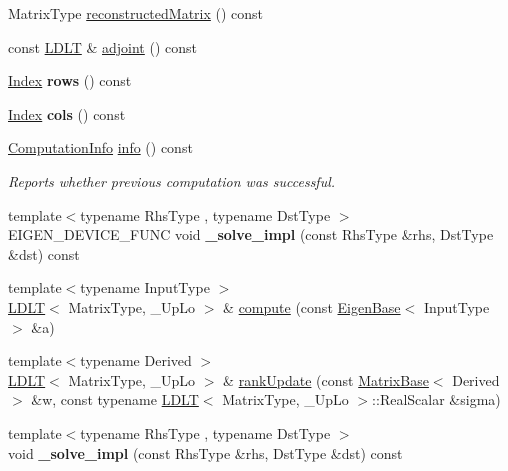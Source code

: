 \begin{DoxyCompactItemize}
\item 
Matrix\+Type \mbox{\hyperlink{class_eigen_1_1_l_d_l_t_ae3693372ca29f50d87d324dfadaae148}{reconstructed\+Matrix}} () const
\item 
const \mbox{\hyperlink{class_eigen_1_1_l_d_l_t}{L\+D\+LT}} \& \mbox{\hyperlink{class_eigen_1_1_l_d_l_t_ac656a209860fa0c6a8faa8bb9f9a06ef}{adjoint}} () const
\item 
\mbox{\label{class_eigen_1_1_l_d_l_t_a96efc3befd020e2260ea1cb6f35769a2}} 
\mbox{\hyperlink{class_eigen_1_1_l_d_l_t_ad9c57eb2fb3bbccd51b9d2e111bea355}{Index}} {\bfseries rows} () const
\item 
\mbox{\label{class_eigen_1_1_l_d_l_t_ae848b7d0c0c7dfb3d029a875363c7848}} 
\mbox{\hyperlink{class_eigen_1_1_l_d_l_t_ad9c57eb2fb3bbccd51b9d2e111bea355}{Index}} {\bfseries cols} () const
\item 
\mbox{\hyperlink{group__enums_ga85fad7b87587764e5cf6b513a9e0ee5e}{Computation\+Info}} \mbox{\hyperlink{class_eigen_1_1_l_d_l_t_a6bd6008501a537d2e16ea672a853bf3e}{info}} () const
\begin{DoxyCompactList}\small\item\em Reports whether previous computation was successful. \end{DoxyCompactList}\item 
\mbox{\label{class_eigen_1_1_l_d_l_t_aa885aa88ba1781f14c96ebb0a581a5e0}} 
{\footnotesize template$<$typename Rhs\+Type , typename Dst\+Type $>$ }\\E\+I\+G\+E\+N\+\_\+\+D\+E\+V\+I\+C\+E\+\_\+\+F\+U\+NC void {\bfseries \+\_\+solve\+\_\+impl} (const Rhs\+Type \&rhs, Dst\+Type \&dst) const
\item 
{\footnotesize template$<$typename Input\+Type $>$ }\\\mbox{\hyperlink{class_eigen_1_1_l_d_l_t}{L\+D\+LT}}$<$ Matrix\+Type, \+\_\+\+Up\+Lo $>$ \& \mbox{\hyperlink{class_eigen_1_1_l_d_l_t_a1777488d0bde83d5f23a622bf8431ef2}{compute}} (const \mbox{\hyperlink{struct_eigen_1_1_eigen_base}{Eigen\+Base}}$<$ Input\+Type $>$ \&a)
\item 
{\footnotesize template$<$typename Derived $>$ }\\\mbox{\hyperlink{class_eigen_1_1_l_d_l_t}{L\+D\+LT}}$<$ Matrix\+Type, \+\_\+\+Up\+Lo $>$ \& \mbox{\hyperlink{class_eigen_1_1_l_d_l_t_a858dc77b65dd48248299bb6a6a758abf}{rank\+Update}} (const \mbox{\hyperlink{class_eigen_1_1_matrix_base}{Matrix\+Base}}$<$ Derived $>$ \&w, const typename \mbox{\hyperlink{class_eigen_1_1_l_d_l_t}{L\+D\+LT}}$<$ Matrix\+Type, \+\_\+\+Up\+Lo $>$\+::Real\+Scalar \&sigma)
\item 
\mbox{\label{class_eigen_1_1_l_d_l_t_a9d9481cd80eabbcfc4739530eb344712}} 
{\footnotesize template$<$typename Rhs\+Type , typename Dst\+Type $>$ }\\void {\bfseries \+\_\+solve\+\_\+impl} (const Rhs\+Type \&rhs, Dst\+Type \&dst) const
\end{DoxyCompactItemize}
